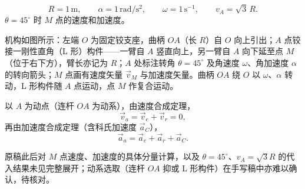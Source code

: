 \begin{exercise}[复习题 4]
\begin{equation}\label{eq:A4-given}
R=1\,\mathrm{m},\qquad \alpha=1\,\mathrm{rad/s^2},\qquad \omega=1\,\mathrm{s^{-1}},\qquad v_A=\sqrt{3}\,R.
\end{equation}
$\theta=45^\circ$ 时 $M$ 点的速度和加速度。

机构如图所示：左端 $O$ 为固定铰支座，曲柄 $OA$（长 $R$）自 $O$ 向上引出；$A$ 点铰接一刚性直角（L 形）构件——一臂自 $A$ 竖直向上，另一臂自 $A$ 向下延至点 $M$（位于右下方），臂长亦记为 $R$；$A$ 处标注转角 $\theta=45^\circ$ 及角速度 $\omega$、角加速度 $\alpha$ 的转向箭头；$M$ 点画有速度矢量 $\vec v_M$ 与加速度矢量。曲柄 $OA$ 绕 $O$ 以 $\omega$、$\alpha$ 转动，L 形构件随 $A$ 点运动，点 $M$ 作复合运动。

\end{exercise}

\begin{solution}
以 $A$ 为动点（连杆 $OA$ 为动系），由速度合成定理，
\begin{equation}\label{eq:A4-vel}
\vec v_a=\vec v_e+\vec v_r=0,
\end{equation}%
再由加速度合成定理（含科氏加速度 $\vec a_C$），
\begin{equation}\label{eq:A4-acc}
\vec a_a=\vec a_e+\vec a_r+\vec a_C.
\end{equation}
\begin{remark}
原稿此后对 $M$ 点速度、加速度的具体分量计算，以及 $\theta=45^\circ$、$v_A=\sqrt{3}R$ 的代入结果未见完整展开；动系选取（连杆 $OA$ 抑或 L 形构件）在手写稿中亦难以确认，待核对。
\end{remark}
\end{solution}

